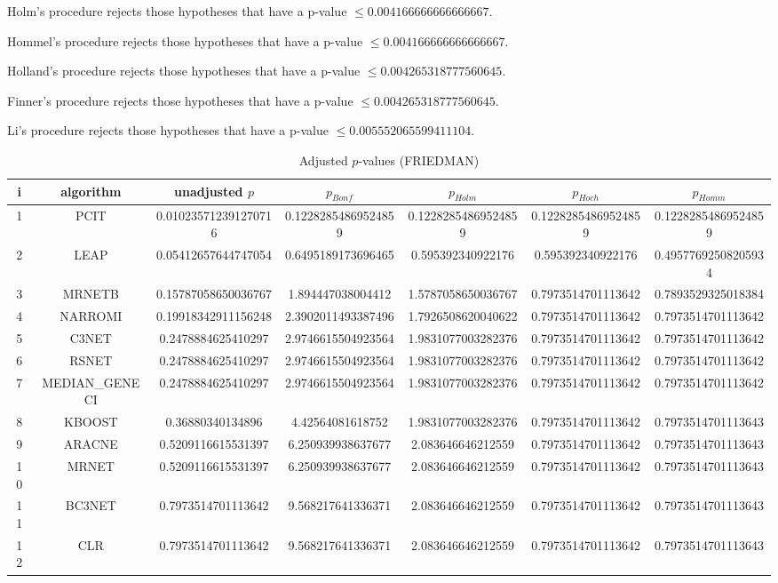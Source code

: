 \documentclass[a4paper,10pt]{article}
\begin{document}
\begin{landscape}
Holm's procedure rejects those hypotheses that have a p-value $\le0.004166666666666667$.


Hommel's procedure rejects those hypotheses that have a p-value $\le0.004166666666666667$.


Holland's procedure rejects those hypotheses that have a p-value $\le0.004265318777560645$.


Finner's procedure rejects those hypotheses that have a p-value $\le0.004265318777560645$.


Li's procedure rejects those hypotheses that have a p-value $\le0.005552065599411104$.



\newpage

\begin{table}[!htp]
\centering\scriptsize
\caption{Adjusted $p$-values (FRIEDMAN)}
\begin{tabular}{ccccccc}
i&algorithm&unadjusted $p$&$p_{Bonf}$&$p_{Holm}$&$p_{Hoch}$&$p_{Homm}$\\
\hline
1&PCIT&0.010235712391270716&0.12282854869524859&0.12282854869524859&0.12282854869524859&0.12282854869524859\\
2&LEAP&0.05412657644747054&0.6495189173696465&0.595392340922176&0.595392340922176&0.49577692508205934\\
3&MRNETB&0.15787058650036767&1.894447038004412&1.5787058650036767&0.7973514701113642&0.7893529325018384\\
4&NARROMI&0.19918342911156248&2.3902011493387496&1.7926508620040622&0.7973514701113642&0.7973514701113642\\
5&C3NET&0.2478884625410297&2.9746615504923564&1.9831077003282376&0.7973514701113642&0.7973514701113642\\
6&RSNET&0.2478884625410297&2.9746615504923564&1.9831077003282376&0.7973514701113642&0.7973514701113642\\
7&MEDIAN_GENECI&0.2478884625410297&2.9746615504923564&1.9831077003282376&0.7973514701113642&0.7973514701113642\\
8&KBOOST&0.36880340134896&4.42564081618752&1.9831077003282376&0.7973514701113642&0.7973514701113643\\
9&ARACNE&0.5209116615531397&6.250939938637677&2.083646646212559&0.7973514701113642&0.7973514701113643\\
10&MRNET&0.5209116615531397&6.250939938637677&2.083646646212559&0.7973514701113642&0.7973514701113643\\
11&BC3NET&0.7973514701113642&9.568217641336371&2.083646646212559&0.7973514701113642&0.7973514701113643\\
12&CLR&0.7973514701113642&9.568217641336371&2.083646646212559&0.7973514701113642&0.7973514701113643\\
\hline
\end{tabular}
\end{table}


\end{landscape}
\end{document}
